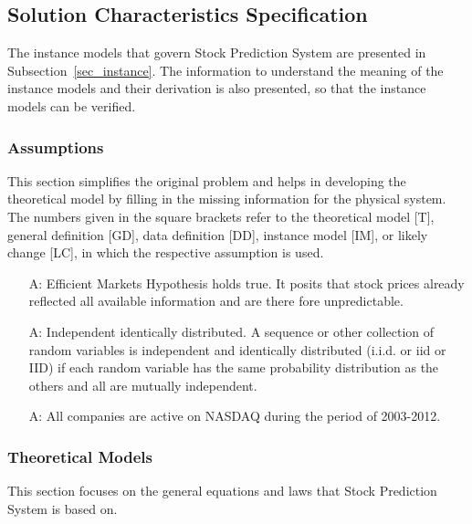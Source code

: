 \documentclass[12pt]{article}
\newcounter{assumpnum} %
\newcommand{\progname}{Stock Prediction System} %
\begin{document}
\subsection{Solution Characteristics Specification}

The instance models that govern \progname{} are presented in
Subsection~\ref{sec_instance}.  The information to understand the meaning of the
instance models and their derivation is also presented, so that the instance
models can be verified.

\subsubsection{Assumptions}

This section simplifies the original problem and helps in developing the
theoretical model by filling in the missing information for the physical
system. The numbers given in the square brackets refer to the theoretical model
[T], general definition [GD], data definition [DD], instance model [IM], or
likely change [LC], in which the respective assumption is used.

\begin{itemize}

\item[A\refstepcounter{assumpnum}\theassumpnum \label{Ass1}:]
Efficient Markets Hypothesis holds true. It posits that stock prices already reflected all available information and are there fore unpredictable. 

\item[A\refstepcounter{assumpnum}\theassumpnum \label{Ass2}:]
Independent identically distributed. A sequence or other collection of random variables is independent and identically distributed (i.i.d. or iid or IID) if each random variable has the same probability distribution as the others and all are mutually independent.

\item[A\refstepcounter{assumpnum}\theassumpnum \label{Ass3}:]
All companies are active on NASDAQ during the period of 2003-2012.

\end{itemize}

\subsubsection{Theoretical Models}\label{sec_theoretical}

This section focuses on the general equations and laws that \progname{} is based
on. 
\end{document}
